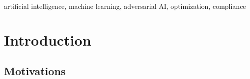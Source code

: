 \documentclass[conference]{IEEEtran}
\begin{document}
\begin{IEEEkeywords}
artificial intelligence, machine learning, adversarial AI, optimization, compliance
\end{IEEEkeywords}


\section{Introduction}
\subsection{Motivations}
\end{document}
